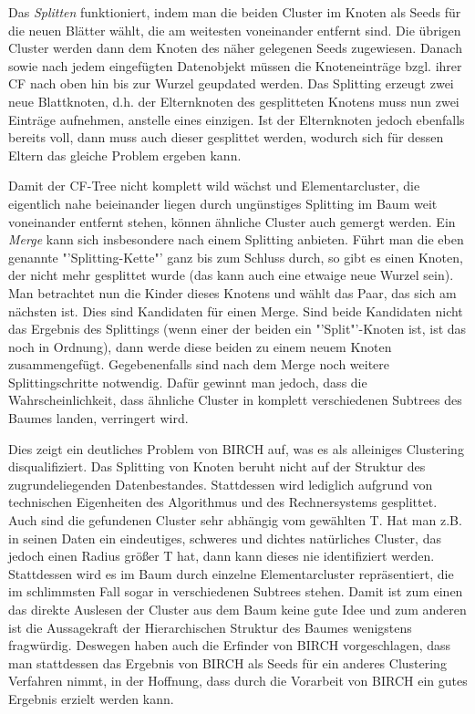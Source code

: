 Das \textit{Splitten} funktioniert, indem man die beiden Cluster im Knoten
als Seeds für die neuen Blätter wählt, die am weitesten voneinander entfernt
sind. Die übrigen Cluster werden dann dem  Knoten des näher gelegenen
Seeds zugewiesen. Danach sowie nach jedem eingefügten Datenobjekt müssen
die Knoteneinträge bzgl. ihrer CF nach oben hin bis zur Wurzel geupdated
werden. Das Splitting erzeugt zwei neue Blattknoten, d.h. der Elternknoten
des gesplitteten Knotens muss nun zwei Einträge aufnehmen, anstelle eines
einzigen. Ist der Elternknoten jedoch ebenfalls bereits voll, dann muss auch
dieser gesplittet werden, wodurch sich für dessen Eltern das gleiche Problem
ergeben kann.

Damit der CF-Tree nicht komplett wild wächst und Elementarcluster, die
eigentlich nahe beieinander liegen durch ungünstiges Splitting im Baum weit
voneinander entfernt stehen, können ähnliche Cluster auch gemergt werden.
Ein \textit{Merge} kann sich insbesondere nach einem Splitting anbieten.
Führt man die eben genannte "'Splitting-Kette"' ganz bis zum Schluss durch,
so gibt es einen Knoten, der nicht mehr gesplittet wurde (das kann auch eine
etwaige neue Wurzel sein). Man betrachtet nun die Kinder dieses Knotens und
wählt das Paar, das sich am nächsten ist. Dies sind Kandidaten für einen Merge.
Sind beide Kandidaten nicht das Ergebnis des Splittings (wenn einer der beiden
ein "'Split"'-Knoten ist, ist das noch in Ordnung), dann werde diese beiden
zu einem neuem Knoten zusammengefügt. Gegebenenfalls sind nach dem Merge
noch weitere Splittingschritte notwendig. Dafür gewinnt man jedoch, dass
die Wahrscheinlichkeit, dass ähnliche Cluster in komplett verschiedenen 
Subtrees des Baumes landen, verringert wird.

Dies zeigt ein deutliches Problem von BIRCH auf, was es als alleiniges 
Clustering disqualifiziert. Das Splitting von Knoten beruht nicht auf der Struktur
des zugrundeliegenden Datenbestandes. Stattdessen wird lediglich aufgrund 
von technischen Eigenheiten des Algorithmus und des Rechnersystems
gesplittet. Auch sind die gefundenen Cluster sehr abhängig vom gewählten
T. Hat man z.B. in seinen Daten ein eindeutiges, schweres und dichtes natürliches
Cluster, das jedoch einen Radius größer T hat, dann kann dieses nie identifiziert
werden. Stattdessen wird es im Baum durch einzelne Elementarcluster 
repräsentiert, die im schlimmsten Fall sogar in verschiedenen Subtrees stehen.
Damit ist zum einen das direkte Auslesen der Cluster aus dem Baum keine gute Idee 
und zum anderen ist die Aussagekraft der Hierarchischen Struktur des
Baumes wenigstens fragwürdig. Deswegen haben auch die Erfinder von BIRCH
vorgeschlagen, dass man stattdessen das Ergebnis von BIRCH als Seeds für
ein anderes Clustering Verfahren nimmt, in der Hoffnung, dass durch die
Vorarbeit von BIRCH ein gutes Ergebnis erzielt werden kann.


